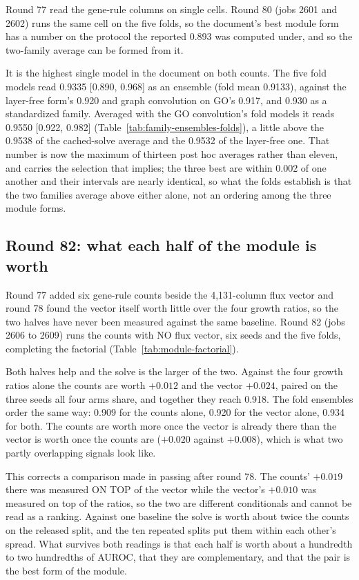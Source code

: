 Round 77 read the gene-rule columns on single cells. Round 80 (jobs 2601 and 2602) runs
the same cell on the five folds, so the document's best module form has a number on the
protocol the reported 0.893 was computed under, and so the two-family average can be
formed from it.

It is the highest single model in the document on both counts. The five fold models read
0.9335 [0.890, 0.968] as an ensemble (fold mean 0.9133), against the layer-free form's
0.920 and graph convolution on GO's 0.917, and 0.930 as a standardized family. Averaged
with the GO convolution's fold models it reads 0.9550 [0.922, 0.982]
(Table~\ref{tab:family-ensembles-folds}), a little above the 0.9538 of the cached-solve
average and the 0.9532 of the layer-free one. That number is now the maximum of thirteen
post hoc averages rather than eleven, and carries the selection that implies; the three
best are within 0.002 of one another and their intervals are nearly identical, so what
the folds establish is that the two families average above either alone, not an ordering
among the three module forms.

\subsection{Round 82: what each half of the module is worth}
\label{sec:round82}

Round 77 added six gene-rule counts beside the 4,131-column flux vector and round 78 found
the vector itself worth little over the four growth ratios, so the two halves have never
been measured against the same baseline. Round 82 (jobs 2606 to 2609) runs the counts with
NO flux vector, six seeds and the five folds, completing the factorial
(Table~\ref{tab:module-factorial}).

Both halves help and the solve is the larger of the two. Against the four growth ratios
alone the counts are worth $+0.012$ and the vector $+0.024$, paired on the three seeds all
four arms share, and together they reach 0.918. The fold ensembles order the same way:
0.909 for the counts alone, 0.920 for the vector alone, 0.934 for both. The counts are
worth more once the vector is already there than the vector is worth once the counts are
($+0.020$ against $+0.008$), which is what two partly overlapping signals look like.

This corrects a comparison made in passing after round 78. The counts' $+0.019$ there was
measured ON TOP of the vector while the vector's $+0.010$ was measured on top of the
ratios, so the two are different conditionals and cannot be read as a ranking. Against
one baseline the solve is worth about twice the counts on the released split, and the ten
repeated splits put them within each other's spread. What survives both readings is that
each half is worth about a hundredth to two hundredths of AUROC, that they are
complementary, and that the pair is the best form of the module.

